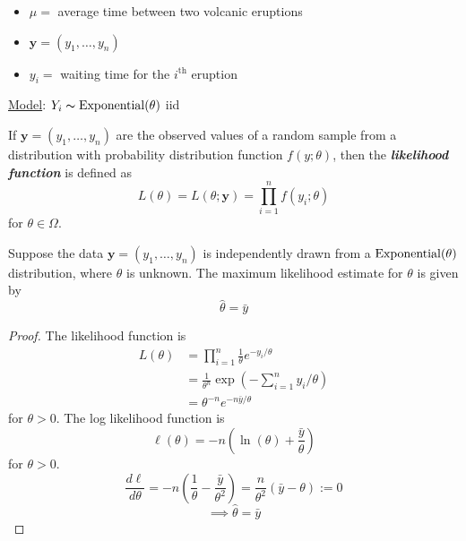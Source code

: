 \begin{exbox}
    \begin{example} $ \; $
        \begin{itemize}
            \item $ \mu= $ average time between two volcanic eruptions
            \item $ \bm{y}=(y_1,\ldots ,y_n) $
            \item $ y_i= $ waiting time for the $ i^{\text{th}} $ eruption
        \end{itemize}
        \underline{Model}: $ Y_i \thicksim \operatorname{Exponential}(\theta) $ iid
    \end{example}
\end{exbox}

\begin{defbox}
    \begin{definition}
        If $ \bm{y}=(y_1,\ldots ,y_n) $ are the observed values of a random sample from a distribution with
        probability distribution function $ f(y;\theta) $, then the \textbf{\emph{likelihood function}}
        is defined as
        \[ L(\theta)=L(\theta;\bm{y})=\prod_{i=1}^n f(y_i;\theta) \]
        for $ \theta\in\Omega $.
    \end{definition}
\end{defbox}

\begin{thmbox}
    \begin{prop}
        Suppose the data $ \bm{y}=(y_1,\ldots ,y_n) $ is independently
        drawn from a $ \operatorname{Exponential}(\theta) $ distribution, where $ \theta $ is unknown.
        The maximum likelihood estimate for $ \theta $ is given by
        \[ \hat{\theta}=\bar{y} \]
    \end{prop}
\end{thmbox}
\begin{proof}
    The likelihood function is
    \begin{align*}
        L(\theta)
         & =\prod_{i=1}^n \frac{1}{\theta} e^{-y_i/\theta}                        \\
         & =\frac{1}{\theta^n} \exp\left(-\sum\limits_{i=1}^{n} y_i/\theta\right) \\
         & =\theta^{-n}e^{-n\bar{y}/\theta}
    \end{align*}
    for $ \theta>0 $. The log likelihood function is
    \[ \ell(\theta)=-n\left( \ln(\theta)+\frac{\bar{y}}{\theta} \right) \]
    for $ \theta>0 $.
    \[ \frac{d\ell}{d\theta} =-n\left( \frac{1}{\theta} -\frac{\bar{y}}{\theta^2} \right)=
        \frac{n}{\theta^2} \left( \bar{y}-\theta \right):=0 \]
    \[ \implies \hat{\theta}=\bar{y} \]
\end{proof}

